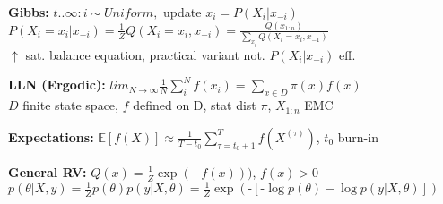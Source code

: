 \textbf{Gibbs:} $t..\infty: i\sim Uniform,$ update $x_i = P(X_i| x_{-i})$\\
$P(X_i = x_i| x_{-i}) = \frac{1}{Z} Q(X_i = x_i, x_{-i}) = \frac{Q(x_{1:n})}{\sum_{x_i} Q(X_i=x_i, x_{-1})}$\\
$\uparrow$ sat. balance equation, practical variant not. $P(X_i| x_{-i})$ eff.\\
\begin{comment}
	We are only updating one of the variables by conditioning on all the other variables.\\
	This can be done efficiently, as the normalizer has to be computed over all $x_i$, which are limited in f.e. a categorical distribution.\\
\end{comment}

\textbf{LLN (Ergodic):} $lim_{N\rightarrow \infty}
\frac{1}{N} \sum_i^N f(x_i) = \sum_{x \in D} \pi(x)f(x)$\\
$D$ finite state space, $f$ defined on D, stat dist $\pi$, $X_{1:n}$ EMC

\begin{comment}
By design of the Markov Chain, the samples depend on each other, so the law of large numbers and the complexity bounds do not apply.\\
	Special case is when the Markov chain is Ergodic and the state space D is finite with stationary $\pi$.
	This is also called the law of large numbers for Markov Chains.\\
	This talks about if it converges to the correct thing, but unfortunately not how fast it converges.\\
\end{comment}

\textbf{Expectations:} $\mathbb{E}[f(X)] \approx \frac{1}{T-t_0} \sum_{\tau=t_0 +1}^T f(X^{(\tau)})$, $t_0$ burn-in\\
\begin{comment}
	The initial state is very crucial when it comes to time-to-convergence. Often the mode is determined heuristically, then started from there.\\
	Establishing convergence rates is very difficult in general.\\
\end{comment}

\textbf{General RV:} $Q(x) = \frac{1}{Z}\exp(-f(x)))$, $f(x) > 0$\\
$p(\theta| X,y) = \frac{1}{Z} p(\theta) p(y| X, \theta) = \frac{1}{Z} \exp(\text{-} [\text{-}\log p(\theta) - \log p(y|X,\theta)])$

